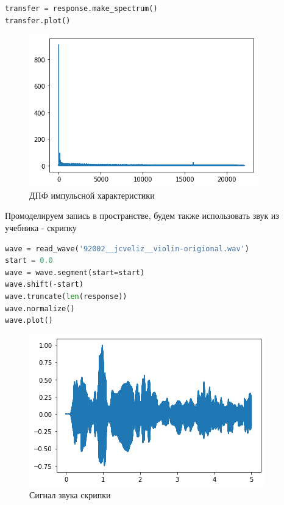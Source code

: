 \begin{lstlisting}[language=Python]
transfer = response.make_spectrum()
transfer.plot()
\end{lstlisting}
\begin{figure}[H]
	\begin{center}
		\includegraphics[scale=1]{fig/lab10/lab10_6.png}
		\caption{ДПФ импульсной характеристики}
	\end{center}
\end{figure}

Промоделируем запись в пространстве, будем также использовать звук из учебника - скрипку

\begin{lstlisting}[language=Python]
wave = read_wave('92002__jcveliz__violin-origional.wav')
start = 0.0
wave = wave.segment(start=start)
wave.shift(-start)
wave.truncate(len(response))
wave.normalize()
wave.plot()
\end{lstlisting}
\begin{figure}[H]
	\begin{center}
		\includegraphics[scale=1]{fig/lab10/lab10_7.png}
		\caption{Сигнал звука скрипки}
	\end{center}
\end{figure}


